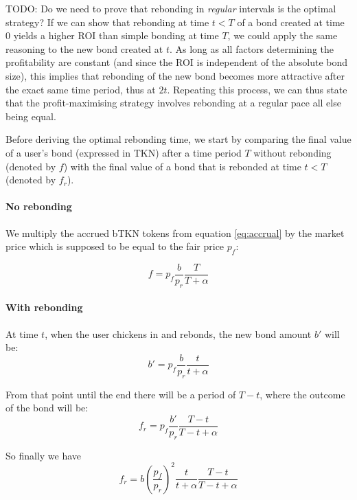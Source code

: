 \documentclass{article}
\begin{document}
TODO: Do we need to prove that rebonding in \textit{regular} intervals is the optimal strategy? If we can show that rebonding at time $t<T$ of a bond created at time 0 yields a higher ROI than simple bonding at time $T$, we could apply the same reasoning to the new bond created at $t$. As long as all factors determining the profitability are constant (and since the ROI is independent of the absolute bond size), this implies that rebonding of the new bond becomes more attractive after the exact same time period, thus at $2t$. Repeating this process, we can thus state that the profit-maximising strategy involves rebonding at a regular pace all else being equal.

Before deriving the optimal rebonding time, we start by comparing the final value of a user's bond (expressed in TKN) after a time period $T$ without rebonding (denoted by $f$) with the final value of a bond that is rebonded at time $t<T$ (denoted by $f_r$).

\paragraph{No rebonding}
We multiply the accrued bTKN tokens from equation \ref{eq:accrual} by the market price which is supposed to be equal to the fair price $p_f$:

\begin{equation}
  \label{eq:o-s}
f = p_f\frac{b}{p_r}\frac{T}{T+\alpha}
\end{equation}

\paragraph{With rebonding}
At time $t$, when the user chickens in and rebonds, the new bond amount $b'$ will be:
\begin{equation}
b'= p_f\frac{b}{p_r}\frac{t}{t+\alpha}
\end{equation}

From that point until the end there will be a period of $T-t$, where the outcome of the bond will be:
\begin{equation}
f_r = p_f\frac{b'}{p_r}\frac{T-t}{T-t+\alpha}
\end{equation}

So finally we have
\begin{equation}
  \label{eq:o-r}
f_r = b\left(\frac{p_f}{p_r}\right)^2\frac{t}{t+\alpha}\frac{T-t}{T-t+\alpha}
\end{equation}
\end{document}
